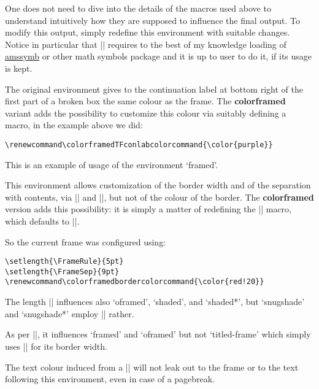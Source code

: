 \documentclass[a4paper,dvipdfmx,11pt]{article}
\def\colorframedTFconlabcolorcommand{\color{purple}}
\def\colorframedbordercolorcommand{\color{red!20}}
\def\ctanpackage#1{\href{https://ctan.org/pkg/#1}{#1}}
\newcommand\colorframed{%
        \texorpdfstring{{\color{joli}\bfseries colorframed}}{colorframed}\xspace}
\begin{document}
\begin{snugshade*}
\leavevmode\color{ForestGreen}
  One does not need to dive into the details of the macros
  used above to understand intuitively how they are supposed
  to influence the final output.  To modify this output,
  simply redefine this environment with suitable changes.
  Notice in particular that \expandafter|\string\blacktriangleright| requires to
  the best of my knowledge loading of \ctanpackage{amssymb} or
  other math symbols package and it is up to user to do it, if
  its usage is kept.

The original environment gives to the continuation label at
bottom right of the first part of a broken box the same colour
as the frame.  The \colorframed variant adds the possibility
to customize this colour via suitably defining a macro, in the
example above we did:
\begin{verbatim}
\renewcommand\colorframedTFconlabcolorcommand{\color{purple}}
\end{verbatim}
\end{snugshade*}

\begin{framed}
  This is an example of usage of the environment `framed'.

  This environment allows customization of the border width
  and of the separation with contents, via |\FrameRule| and
  |\FrameSep|, but not of the colour of the border.  The
  \colorframed version adds this possibility: it is simply a
  matter of redefining the |\colorframedbordercolorcommand|
  macro, which defaults to |\normalcolor|.

\color{blue}
  So the current frame was configured using:
\begin{verbatim}
\setlength{\FrameRule}{5pt}
\setlength{\FrameSep}{9pt}
\renewcommand\colorframedbordercolorcommand{\color{red!20}}
\end{verbatim}
\begin{footnotesize}\normalcolor
  The length |\FrameSep| influences also `oframed', `shaded', and `shaded*',
  but `snugshade' and `snugshade*' employ |\fboxsep| rather.

  As per |\FrameRule|, it influences `framed' and `oframed' but not
  `titled-frame' which simply uses |\fboxrule| for its border width.\par
\end{footnotesize}
  The text colour induced from a |\color{blue}|
  will not leak out to the frame or to the text following this
  environment, even in case of a pagebreak.
\end{framed}
\end{document}
